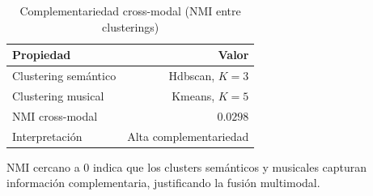 \begin{table}[htbp]
  \centering
  \caption{Complementariedad cross-modal (NMI entre clusterings)}
  \label{tab:cross_modal_nmi}
  \begin{tabular}{lr}
    \toprule
    Propiedad & Valor \\
    \midrule
    Clustering semántico & Hdbscan, $K=3$ \\
    Clustering musical & Kmeans, $K=5$ \\
    NMI cross-modal & $0.0298$ \\
    \midrule
    Interpretación & Alta complementariedad \\
    \bottomrule
  \end{tabular}
  \begin{tablenotes}[flushleft]
    \small
    \item NMI cercano a 0 indica que los clusters semánticos y musicales capturan información complementaria, justificando la fusión multimodal.
  \end{tablenotes}
\end{table}